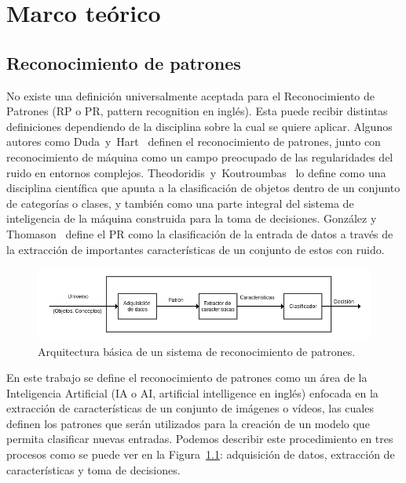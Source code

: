 \chapter[Marco teórico]{Marco teórico}
\label{ch:estado_del_arte}

\section{Reconocimiento de patrones}
\label{sec:rec_patrones}
	No existe una definición universalmente aceptada para el Reconocimiento de Patrones (RP o PR, pattern recognition en inglés). Esta puede recibir distintas definiciones dependiendo de la disciplina sobre la cual se quiere aplicar. Algunos autores como Duda~y~Hart~\cite{Duda1973} definen el reconocimiento de patrones, junto con reconocimiento de máquina como un campo preocupado de las regularidades del ruido en entornos complejos. Theodoridis~y~Koutroumbas~\cite{Theodoridis2008} lo define como una disciplina científica que apunta a la clasificación de objetos dentro de un conjunto de categorías o clases, y también como una parte integral del sistema de inteligencia de la máquina construida para la toma de decisiones. González y Thomason~\cite{Gonzalez1978} define el PR como la clasificación de la entrada de datos a través de la extracción de importantes características de un conjunto de estos con ruido. 

\begin{figure}[b]
  \centering
   \includegraphics[width=1\textwidth]{Figuras/Diagramas/estado_del_arte/Reconocimiento_de_patrones.png}
  \caption{Arquitectura básica de un sistema de reconocimiento de patrones.}
  \label{art:fig:arquitectura}
\end{figure}


En este trabajo se define el reconocimiento de patrones como un área de la Inteligencia Artificial (IA o AI, artificial intelligence en inglés) enfocada en la extracción de características de un conjunto de imágenes o vídeos, las cuales definen los patrones que serán utilizados para la creación de un modelo que permita clasificar nuevas entradas. Podemos describir este procedimiento en tres procesos como se puede ver en la Figura~\ref{art:fig:arquitectura}: adquisición de datos, extracción de características y toma de decisiones. 

